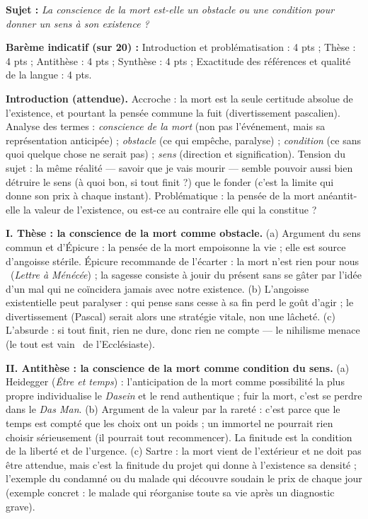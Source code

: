 \documentclass[11pt]{article}
\begin{document}
\begin{corrige}
\textbf{Sujet :} \emph{La conscience de la mort est-elle un obstacle ou une condition pour donner un sens à son existence ?}

\textbf{Barème indicatif (sur 20) :} Introduction et problématisation : 4 pts ; Thèse : 4 pts ; Antithèse : 4 pts ; Synthèse : 4 pts ; Exactitude des références et qualité de la langue : 4 pts.

\textbf{Introduction (attendue).} Accroche : la mort est la seule certitude absolue de l'existence, et pourtant la pensée commune la fuit (divertissement pascalien). Analyse des termes : \emph{conscience de la mort} (non pas l'événement, mais sa représentation anticipée) ; \emph{obstacle} (ce qui empêche, paralyse) ; \emph{condition} (ce sans quoi quelque chose ne serait pas) ; \emph{sens} (direction et signification). Tension du sujet : la même réalité — savoir que je vais mourir — semble pouvoir aussi bien détruire le sens (à quoi bon, si tout finit ?) que le fonder (c'est la limite qui donne son prix à chaque instant). Problématique : la pensée de la mort anéantit-elle la valeur de l'existence, ou est-ce au contraire elle qui la constitue ?

\textbf{I. Thèse : la conscience de la mort comme obstacle.} (a) Argument du sens commun et d'Épicure : la pensée de la mort empoisonne la vie ; elle est source d'angoisse stérile. Épicure recommande de l'écarter : \guillemotleft la mort n'est rien pour nous \guillemotright\ (\emph{Lettre à Ménécée}) ; la sagesse consiste à jouir du présent sans se gâter par l'idée d'un mal qui ne coïncidera jamais avec notre existence. (b) L'angoisse existentielle peut paralyser : qui pense sans cesse à sa fin perd le goût d'agir ; le divertissement (Pascal) serait alors une stratégie vitale, non une lâcheté. (c) L'absurde : si tout finit, rien ne dure, donc rien ne compte — le nihilisme menace (le \guillemotleft tout est vain \guillemotright\ de l'Ecclésiaste).

\textbf{II. Antithèse : la conscience de la mort comme condition du sens.} (a) Heidegger (\emph{Être et temps}) : l'anticipation de la mort comme possibilité la plus propre individualise le \emph{Dasein} et le rend authentique ; fuir la mort, c'est se perdre dans le \emph{Das Man}. (b) Argument de la valeur par la rareté : c'est parce que le temps est compté que les choix ont un poids ; un immortel ne pourrait rien choisir sérieusement (il pourrait tout recommencer). La finitude est la condition de la liberté et de l'urgence. (c) Sartre : la mort vient de l'extérieur et ne doit pas être attendue, mais c'est la finitude du projet qui donne à l'existence sa densité ; l'exemple du condamné ou du malade qui découvre soudain le prix de chaque jour (exemple concret : le malade qui réorganise toute sa vie après un diagnostic grave).


\end{corrige}
\end{document}
